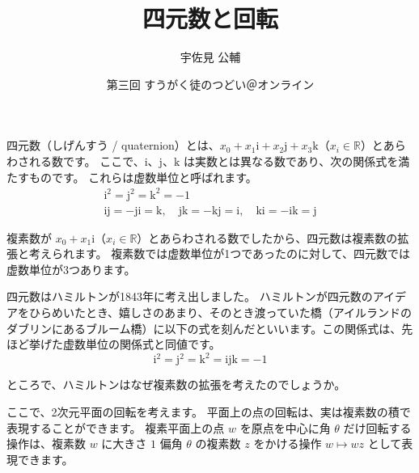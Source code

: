 \documentclass{jlreq}
\title{四元数と回転}
\author{宇佐見 公輔}
\date{第三回 すうがく徒のつどい＠オンライン}
\newcommand{\ii}{\mathrm{i}}
\newcommand{\jj}{\mathrm{j}}
\newcommand{\kk}{\mathrm{k}}
\begin{document}
\maketitle

四元数（しげんすう / quaternion）とは、\(x_0+x_1\ii+x_2\jj+x_3\kk\)（\(x_i\in\mathbb{R}\)）とあらわされる数です。
ここで、\(\ii\)、\(\jj\)、\(\kk\) は実数とは異なる数であり、次の関係式を満たすものです。
これらは虚数単位と呼ばれます。
\begin{gather*}
    \ii^2=\jj^2=\kk^2=-1\\
    \ii\jj=-\jj\ii=\kk,\quad\jj\kk=-\kk\jj=\ii,\quad\kk\ii=-\ii\kk=\jj
\end{gather*}

複素数が \(x_0+x_1\ii\)（\(x_i\in\mathbb{R}\)）とあらわされる数でしたから、四元数は複素数の拡張と考えられます。
複素数では虚数単位が1つであったのに対して、四元数では虚数単位が3つあります。

四元数はハミルトンが1843年に考え出しました。
ハミルトンが四元数のアイデアをひらめいたとき、嬉しさのあまり、そのとき渡っていた橋（アイルランドのダブリンにあるブルーム橋）に以下の式を刻んだといいます。この関係式は、先ほど挙げた虚数単位の関係式と同値です。
\[
    \ii^2=\jj^2=\kk^2=\ii\jj\kk=-1
\]

ところで、ハミルトンはなぜ複素数の拡張を考えたのでしょうか。

ここで、2次元平面の回転を考えます。
平面上の点の回転は、実は複素数の積で表現することができます。
複素平面上の点 \(w\) を原点を中心に角 \(\theta\) だけ回転する操作は、複素数 \(w\) に大きさ \(1\) 偏角 \(\theta\) の複素数 \(z\) をかける操作 \(w\mapsto wz\) として表現できます。

\begin{figure}
    \centering
\end{figure}
\end{document}
